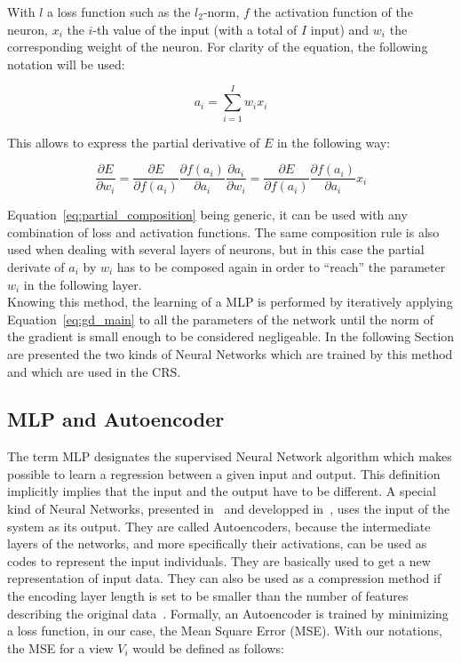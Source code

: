     With $l$ a loss function such as the $l_2$-norm, $f$ the activation function of the neuron, $x_i$ the $i$-th value of the input (with a total of $I$ input) and $w_i$ the corresponding weight of the neuron. For clarity of the equation, the following notation will be used:

    \begin{equation}
        a_i = \sum_{i=1}^I w_i x_i
        \label{eq:weighted_sum}
    \end{equation}

    This allows to express the partial derivative of $E$ in the following way:

    \begin{equation}
        \frac{\partial E}{\partial w_i} = \frac{\partial E}{\partial f\left( a_i\right)} \frac{\partial f(a_i)}{\partial a_i}\frac{\partial a_i}{\partial w_i} = \frac{\partial E}{\partial f\left( a_i\right)} \frac{\partial f(a_i)}{\partial a_i} x_i
        \label{eq:partial_composition}
    \end{equation}

    Equation~\ref{eq:partial_composition} being generic, it can be used with any combination of loss and activation functions. The same composition rule is also used when dealing with several layers of neurons, but in this case the partial derivate of $a_i$ by $w_i$ has to be composed again in order to ``reach'' the parameter $w_i$ in the following layer.\\

    Knowing this method, the learning of a MLP is performed by iteratively applying Equation~\ref{eq:gd_main} to all the parameters of the network until the norm of the gradient is small enough to be considered negligeable. In the following Section are presented the two kinds of Neural Networks which are trained by this method and which are used in the CRS.\@

    \subsection{MLP and Autoencoder}

    The term MLP designates the supervised Neural Network algorithm which makes possible to learn a regression between a given input and output. This definition implicitly implies that the input and the output have to be different. A special kind of Neural Networks, presented in~\cite{hinton2006reducing} and developped in~\cite{vincent2008extracting}, uses the input of the system as its output. They are called Autoencoders, because the intermediate layers of the networks, and more specifically their activations, can be used as codes to represent the input individuals. They are basically used to get a new representation of input data. They can also be used as a compression method if the encoding layer length is set to be smaller than the number of features describing the original data~\cite{hinton2006reducing}. Formally, an Autoencoder is trained by minimizing a loss function, in our case, the Mean Square Error (MSE). With our notations, the MSE for a view $V_i$ would be defined as follows:
		
